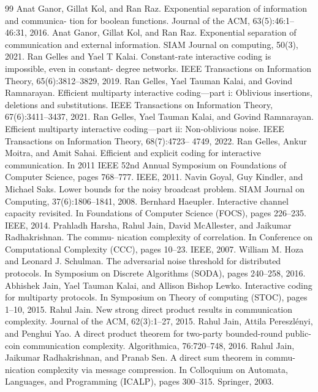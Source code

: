 \begin{thebibliography}{99}
 Anat Ganor, Gillat Kol, and Ran Raz. Exponential separation of information and communica- tion for boolean functions. Journal of the ACM, 63(5):46:1–46:31, 2016.
 Anat Ganor, Gillat Kol, and Ran Raz. Exponential separation of communication and external information. SIAM Journal on computing, 50(3), 2021.
 Ran Gelles and Yael T Kalai. Constant-rate interactive coding is impossible, even in constant- degree networks. IEEE Transactions on Information Theory, 65(6):3812–3829, 2019.
 Ran Gelles, Yael Tauman Kalai, and Govind Ramnarayan. Efficient multiparty interactive coding—part i: Oblivious insertions, deletions and substitutions. IEEE Transactions on Information Theory, 67(6):3411–3437, 2021.
 Ran Gelles, Yael Tauman Kalai, and Govind Ramnarayan. Efficient multiparty interactive coding—part ii: Non-oblivious noise. IEEE Transactions on Information Theory, 68(7):4723– 4749, 2022.
 Ran Gelles, Ankur Moitra, and Amit Sahai. Efficient and explicit coding for interactive communication. In 2011 IEEE 52nd Annual Symposium on Foundations of Computer Science, pages 768–777. IEEE, 2011.
 Navin Goyal, Guy Kindler, and Michael Saks. Lower bounds for the noisy broadcast problem. SIAM Journal on Computing, 37(6):1806–1841, 2008.
 Bernhard Haeupler. Interactive channel capacity revisited. In Foundations of Computer Science (FOCS), pages 226–235. IEEE, 2014.
 Prahladh Harsha, Rahul Jain, David McAllester, and Jaikumar Radhakrishnan. The commu- nication complexity of correlation. In Conference on Computational Complexity (CCC), pages 10–23. IEEE, 2007.
 William M. Hoza and Leonard J. Schulman. The adversarial noise threshold for distributed protocols. In Symposium on Discrete Algorithms (SODA), pages 240–258, 2016.
 Abhishek Jain, Yael Tauman Kalai, and Allison Bishop Lewko. Interactive coding for multiparty protocols. In Symposium on Theory of computing (STOC), pages 1–10, 2015.
 Rahul Jain. New strong direct product results in communication complexity. Journal of the ACM, 62(3):1–27, 2015.
 Rahul Jain, Attila Pereszlényi, and Penghui Yao. A direct product theorem for two-party bounded-round public-coin communication complexity. Algorithmica, 76:720–748, 2016.
 Rahul Jain, Jaikumar Radhakrishnan, and Pranab Sen. A direct sum theorem in commu- nication complexity via message compression. In Colloquium on Automata, Languages, and Programming (ICALP), pages 300–315. Springer, 2003.

\end{thebibliography}
